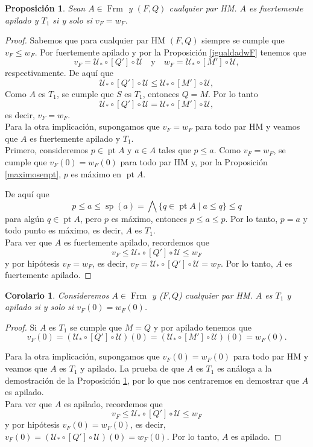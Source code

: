 \documentclass[11pt]{amsart}
\DeclareMathOperator{\pt}{pt}
\DeclareMathOperator{\Sp}{sp}
\DeclareMathOperator{\Frm}{Frm}
\theoremstyle{plain}
\newtheorem{cor}[thm]{Corolario}
\newtheorem{prop}[thm]{Proposición}
\theoremstyle{definition}
\begin{document}
\begin{prop}\label{v_F=w_F}
Sean $A\in \Frm$ y $(F, Q)$ cualquier par HM. $A$ es fuertemente apilado y $T_1$ si y solo si $v_F=w_F$. 
\end{prop}

\begin{proof}
Sabemos que para cualquier par HM $(F, Q)$ siempre se cumple que $v_F\leq w_F$. Por fuertemente apilado y por la Proposición \ref{igualdadwF} tenemos que
\[
v_F=\mathcal{U}_*\circ [Q']\circ \mathcal{U}\quad \text{y}\quad w_F=\mathcal{U}_*\circ[M']\circ \mathcal{U},
\]
respectivamente. De aquí que
\[
\mathcal{U}_*\circ [Q']\circ \mathcal{U}\leq\mathcal{U}_*\circ[M']\circ \mathcal{U},
\]
Como $A$ es $T_1$, se cumple que $S$ es $T_1$, entonces $Q=M$. Por lo tanto
\[
\mathcal{U}_*\circ [Q']\circ \mathcal{U}=\mathcal{U}_*\circ[M']\circ \mathcal{U},
\]
es decir, $v_F=w_F$.\\

Para la otra implicación, supongamos que $v_F=w_F$ para todo par HM y veamos que $A$ es fuertemente apilado y $T_1$.\\

Primero, consideremos $p\in \pt A$ y $a\in A$ tales que $p\leq a$. Como $v_F=w_F$, se cumple que $v_F(0)=w_F(0)$ para todo par HM y, por la Proposición \ref{maximosenpt}, $p$ es máximo en $\pt A$.

De aquí que 
\[
p\leq a\leq \Sp(a)=\bigwedge\{q\in \pt A\mid a\leq q\}\leq q
\]
para algún $q\in \pt A$, pero $p$ es máximo, entonces $p\leq a\leq p$. Por lo tanto, $p=a$ y todo punto es máximo, es decir, $A$ es $T_1$.\\

Para ver que $A$ es fuertemente apilado, recordemos que
\[
v_F\leq \mathcal{U}_*\circ [Q']\circ \mathcal{U}\leq w_F
\]
y por hipótesis $v_F=w_F$, es decir, $v_F=\mathcal{U}_*\circ [Q']\circ \mathcal{U}=w_F$. Por lo tanto, $A$ es fuertemente apilado.
\end{proof}

\begin{cor}\label{focales}
Consideremos $A\in \Frm$ y ($F, Q$) cualquier par HM. $A$ es $T_1$ y apilado si y solo si $v_F(0)=w_F(0)$.
\end{cor}

\begin{proof}
Si $A$ es $T_1$ se cumple que $M=Q$ y por apilado tenemos que 
\[
v_F(0)=(\mathcal{U}_*\circ [Q']\circ \mathcal{U})(0)=(\mathcal{U}_*\circ[M']\circ \mathcal{U})(0)=w_F(0).
\]

Para la otra implicación, supongamos que $v_F(0)=w_F(0)$ para todo par HM y veamos que $A$ es $T_1$ y apilado. La prueba de que $A$ es $T_1$ es análoga a la 
demostración de la Proposición \ref{v_F=w_F}, por lo que nos centraremos en demostrar que $A$ es apilado.\\

Para ver que $A$ es apilado, recordemos que
\[
v_F\leq \mathcal{U}_*\circ [Q']\circ \mathcal{U}\leq w_F
\]
y por hipótesis $v_F(0)=w_F(0)$, es decir, $v_F(0)=(\mathcal{U}_*\circ [Q']\circ \mathcal{U})(0)=w_F(0)$. Por lo tanto, $A$ es apilado.
\end{proof}
\end{document}

